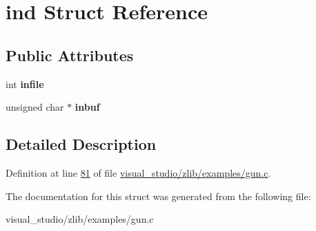 \hypertarget{structind}{}\section{ind Struct Reference}
\label{structind}
\subsection*{Public Attributes}
\begin{DoxyCompactItemize}
\item 
\mbox{\label{structind_af2f798c95f438a3718632db7d21e219a}} 
int {\bfseries infile}
\item 
\mbox{\label{structind_af2e3a8893c2fae9c9a6431709b033fc7}} 
unsigned char $\ast$ {\bfseries inbuf}
\end{DoxyCompactItemize}


\subsection{Detailed Description}


Definition at line \hyperlink{visual__studio_2zlib_2examples_2gun_8c_source_l00081}{81} of file \hyperlink{visual__studio_2zlib_2examples_2gun_8c_source}{visual\+\_\+studio/zlib/examples/gun.\+c}.



The documentation for this struct was generated from the following file\+:\begin{DoxyCompactItemize}
\item 
visual\+\_\+studio/zlib/examples/gun.\+c\end{DoxyCompactItemize}
